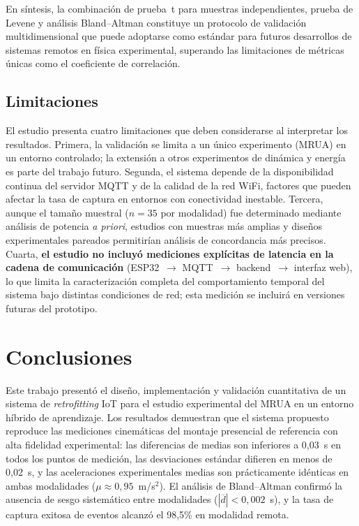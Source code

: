 \documentclass{espol-rte}
\begin{document}
En s\'intesis, la combinaci\'on de prueba~t para muestras independientes, prueba de Levene y an\'alisis Bland--Altman constituye un protocolo de validaci\'on multidimensional que puede adoptarse como est\'andar para futuros desarrollos de sistemas remotos en f\'isica experimental, superando las limitaciones de m\'etricas \'unicas como el coeficiente de correlaci\'on.

\subsection{Limitaciones}

El estudio presenta cuatro limitaciones que deben considerarse al interpretar los resultados. Primera, la validaci\'on se limita a un \'unico experimento (MRUA) en un entorno controlado; la extensi\'on a otros experimentos de din\'amica y energ\'ia es parte del trabajo futuro. Segunda, el sistema depende de la disponibilidad continua del servidor MQTT y de la calidad de la red WiFi, factores que pueden afectar la tasa de captura en entornos con conectividad inestable. Tercera, aunque el tama\~no muestral ($n=35$ por modalidad) fue determinado mediante an\'alisis de potencia \textit{a priori}, estudios con muestras m\'as amplias y dise\~nos experimentales pareados permitir\'ian an\'alisis de concordancia m\'as precisos. Cuarta, \textbf{el estudio no incluy\'o mediciones expl\'icitas de latencia en la cadena de comunicaci\'on} (ESP32~$\to$ MQTT~$\to$ backend~$\to$ interfaz web), lo que limita la caracterizaci\'on completa del comportamiento temporal del sistema bajo distintas condiciones de red; esta medici\'on se incluir\'a en versiones futuras del prototipo.

\section{Conclusiones}

Este trabajo present\'o el dise\~no, implementaci\'on y validaci\'on cuantitativa de un sistema de \textit{retrofitting} IoT para el estudio experimental del MRUA en un entorno h\'ibrido de aprendizaje. Los resultados demuestran que el sistema propuesto reproduce las mediciones cinem\'aticas del montaje presencial de referencia con alta fidelidad experimental: las diferencias de medias son inferiores a 0{,}03~s en todos los puntos de medici\'on, las desviaciones est\'andar difieren en menos de 0{,}02~s, y las aceleraciones experimentales medias son pr\'acticamente id\'enticas en ambas modalidades ($\mu \approx 0{,}95$~m/s$^2$). El an\'alisis de Bland--Altman confirm\'o la ausencia de sesgo sistem\'atico entre modalidades ($|\overline{d}| < 0{,}002$~s), y la tasa de captura exitosa de eventos alcanz\'o el 98{,}5\% en modalidad remota.
\end{document}
